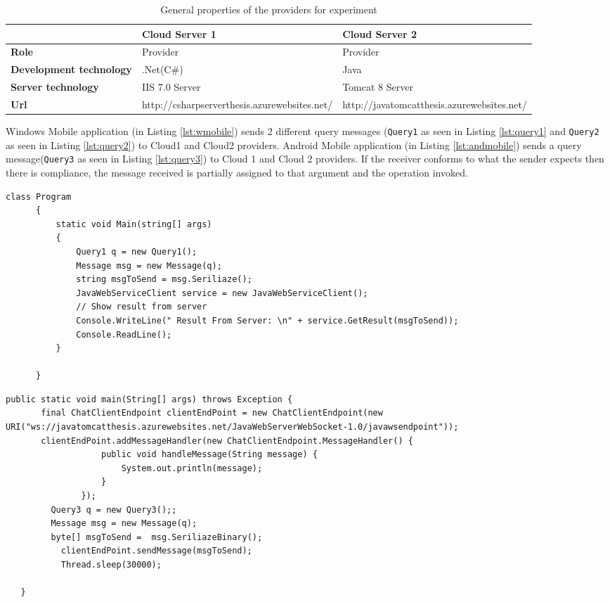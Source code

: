 \begin{table}
\centering
\begin{tabular}{ p{2.00cm} p{7.00cm} p{7.00cm}}
\toprule
\multicolumn{1}{l}{ } & \textbf{Cloud Server 1} & \textbf{Cloud Server 2}\\
\midrule
 \textbf{Role}                  & Provider       & Provider       \\
 \rowcolor{Gray}
 \textbf{Development technology}& .Net(C\#)      & Java            \\
 \textbf{Server technology}     & IIS 7.0 Server & Tomcat 8 Server \\
 \rowcolor{Gray}
 \textbf{Url}                   & http://csharpserverthesis.azurewebsites.net/ & http://javatomcatthesis.azurewebsites.net/ \\
\bottomrule
\end{tabular}
\caption[General properties of the providers for experiment.]{General properties of the providers for experiment}
\label{tab:providerProp}
\end{table}

Windows Mobile application (in Listing \ref{lst:wmobile}) sends 2 different query messages ({\tt Query1} as seen in Listing \ref{lst:query1} and {\tt Query2} as seen in Listing \ref{lst:query2}) to Cloud1 and Cloud2 providers. Android Mobile application (in Listing \ref{lst:andmobile}) sends a query message({\tt Query3} as seen in Listing \ref{lst:query3}) to Cloud 1 and Cloud 2 providers. If the receiver conforms to what the sender expects then there is compliance, the message received is partially assigned to that argument and the operation invoked.

\begin{lstlisting}[caption=Windows Mobile application, label=lst:wmobile]
  class Program
      {
          static void Main(string[] args)
          {
              Query1 q = new Query1();
              Message msg = new Message(q);
              string msgToSend = msg.Seriliaze();
              JavaWebServiceClient service = new JavaWebServiceClient();
              // Show result from server
              Console.WriteLine(" Result From Server: \n" + service.GetResult(msgToSend));
              Console.ReadLine();
          }

      }
\end{lstlisting}

\begin{lstlisting}[caption=Android Mobile application, label=lst:andmobile]
  public static void main(String[] args) throws Exception {
       final ChatClientEndpoint clientEndPoint = new ChatClientEndpoint(new URI("ws://javatomcatthesis.azurewebsites.net/JavaWebServerWebSocket-1.0/javawsendpoint"));
       clientEndPoint.addMessageHandler(new ChatClientEndpoint.MessageHandler() {
                   public void handleMessage(String message) {
                       System.out.println(message);
                   }
               });
         Query3 q = new Query3();;
         Message msg = new Message(q);
         byte[] msgToSend =  msg.SeriliazeBinary();
           clientEndPoint.sendMessage(msgToSend);
           Thread.sleep(30000);

   }
\end{lstlisting}

